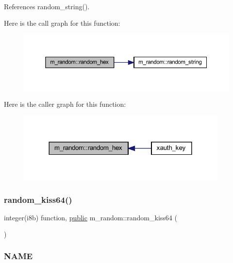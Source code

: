 References random\+\_\+string().

Here is the call graph for this function\+:
\nopagebreak
\begin{figure}[H]
\begin{center}
\leavevmode
\includegraphics[width=350pt]{namespacem__random_a2fa2c1b1bcef16ff3be995981738cec0_cgraph}
\end{center}
\end{figure}
Here is the caller graph for this function\+:
\nopagebreak
\begin{figure}[H]
\begin{center}
\leavevmode
\includegraphics[width=300pt]{namespacem__random_a2fa2c1b1bcef16ff3be995981738cec0_icgraph}
\end{center}
\end{figure}
\mbox{\label{namespacem__random_a02085190ba5e6a34a61d89800f01a34b}} 
\subsubsection{\texorpdfstring{random\+\_\+kiss64()}{random\_kiss64()}}
{\footnotesize\ttfamily integer(i8b) function, \hyperlink{M__stopwatch_83_8txt_a2f74811300c361e53b430611a7d1769f}{public} m\+\_\+random\+::random\+\_\+kiss64 (\begin{DoxyParamCaption}{ }\end{DoxyParamCaption})}



\subsubsection*{N\+A\+ME}

